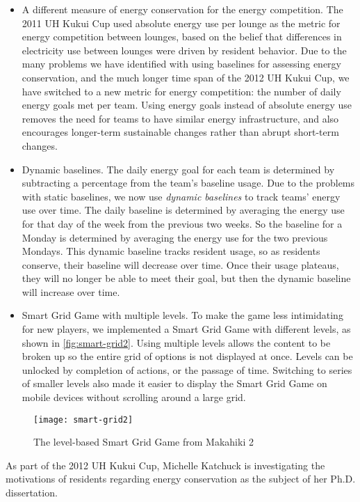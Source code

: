 \begin{itemize}
	\item A different measure of energy conservation for the energy competition. The 2011 UH Kukui Cup used absolute energy use per lounge as the metric for energy competition between lounges, based on the belief that differences in electricity use between lounges were driven by resident behavior. Due to the many problems we have identified with using baselines for assessing energy conservation, and the much longer time span of the 2012 UH Kukui Cup, we have switched to a new metric for energy competition: the number of daily energy goals met per team. Using energy goals instead of absolute energy use removes the need for teams to have similar energy infrastructure, and also encourages longer-term sustainable changes rather than abrupt short-term changes.
	\item Dynamic baselines. The daily energy goal for each team is determined by subtracting a percentage from the team's baseline usage. Due to the problems with static baselines, we now use \emph{dynamic baselines} to track teams' energy use over time. The daily baseline is determined by averaging the energy use for that day of the week from the previous two weeks. So the baseline for a Monday is determined by averaging the energy use for the two previous Mondays. This dynamic baseline tracks resident usage, so as residents conserve, their baseline will decrease over time. Once their usage plateaus, they will no longer be able to meet their goal, but then the dynamic baseline will increase over time.
	\item Smart Grid Game with multiple levels. To make the game less intimidating for new players, we implemented a Smart Grid Game with different levels, as shown in \autoref{fig:smart-grid2}. Using multiple levels allows the content to be broken up so the entire grid of options is not displayed at once. Levels can be unlocked by completion of actions, or the passage of time. Switching to series of smaller levels also made it easier to display the Smart Grid Game on mobile devices without scrolling around a large grid.
\end{itemize}

\begin{figure}[htbp]
	\centering
	\texttt{[image: smart-grid2]}
	\caption{The level-based Smart Grid Game from Makahiki 2}
	\label{fig:smart-grid2}
\end{figure}

As part of the 2012 UH Kukui Cup, Michelle Katchuck is investigating the motivations of residents regarding energy conservation as the subject of her Ph.D. dissertation.


